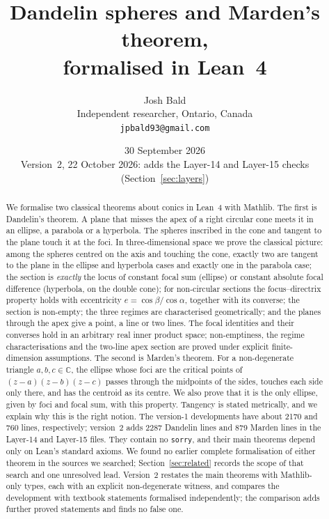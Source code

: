 \documentclass[11pt]{article}
\title{Dandelin spheres and Marden's theorem,\\ formalised in Lean~4}
\author{Josh Bald\\ \small Independent researcher, Ontario, Canada\\ \small\texttt{jpbald93@gmail.com}}
\date{30 September 2026\\ \small Version~2, 22 October 2026: adds the Layer-14 and Layer-15 checks
(Section~\ref{sec:layers})}
\theoremstyle{remark}
\newcommand{\lean}[1]{\texttt{#1}}
\newcommand{\C}{\mathbb{C}}
\begin{document}
\maketitle

\begin{abstract}
We formalise two classical theorems about conics in Lean~4 with Mathlib. The first is Dandelin's
theorem. A plane that misses the apex of a right circular cone meets it in an ellipse, a parabola
or a hyperbola. The spheres inscribed in the cone and tangent to the plane touch it at the foci.
In three-dimensional space we prove the classical picture: among the spheres centred on the axis
and touching the cone, exactly two are tangent to the plane in the ellipse and hyperbola cases and
exactly one in the parabola case; the section is \emph{exactly} the locus of constant focal sum
(ellipse) or constant absolute focal difference (hyperbola, on the double cone); for non-circular
sections the focus--directrix property holds with eccentricity $e=\cos\beta/\cos\alpha$, together
with its converse; the section is non-empty; the three regimes are characterised geometrically;
and the planes through the apex give a point, a line or two lines. The focal identities and
their converses hold in an arbitrary real inner product space; non-emptiness, the regime
characterisations and the two-line apex section are proved under explicit finite-dimension
assumptions. The second is Marden's theorem. For a non-degenerate triangle $a,b,c\in\C$, the ellipse
whose foci are the critical points of $(z-a)(z-b)(z-c)$ passes through the midpoints of the sides,
touches each side only there, and has the centroid as its centre. We also prove that it is the
only ellipse, given by foci and focal sum, with this property. Tangency is stated metrically, and
we explain why this is the right notion. The version-1 developments have about 2170 and 760 lines, respectively; version~2 adds 2287
Dandelin lines and 879 Marden lines in the Layer-14 and Layer-15 files. They
contain no \lean{sorry}, and their main theorems depend only on Lean's standard axioms. We found
no earlier complete formalisation of either theorem in the sources we searched;
Section~\ref{sec:related} records the scope of that search and one unresolved lead.
Version~2 restates the main theorems with Mathlib-only types, each with an explicit
non-degenerate witness, and compares the development with textbook statements formalised
independently; the comparison adds further proved statements and finds no false one.
\end{abstract}
\end{document}

